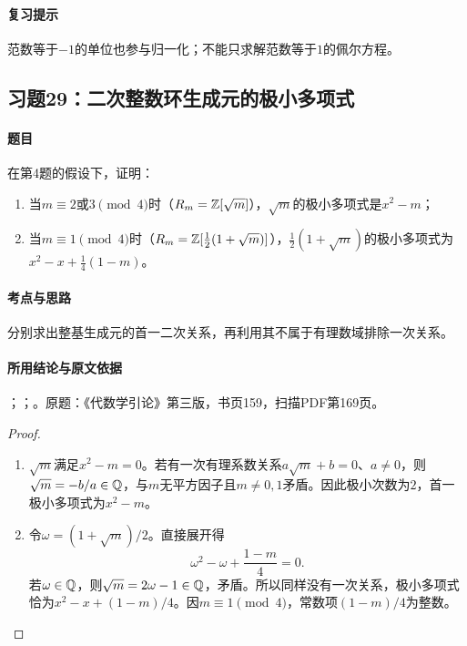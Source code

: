 \paragraph{复习提示}

范数等于$-1$的单位也参与归一化；不能只求解范数等于$1$的佩尔方程。

\subsection{习题29：二次整数环生成元的极小多项式}

\label{ex:4:29}

\paragraph{题目}

在第4题的假设下，证明：
\begin{enumerate}[label=(\roman*)]
\item 当$m\equiv2$或$3\pmod4$时（$R_m=\mathbb Z[\sqrt m]$），$\sqrt m$的极小多项式是$x^2-m$；
\item 当$m\equiv1\pmod4$时（$R_m=\mathbb Z[\tfrac12(1+\sqrt m)]$），$\tfrac12(1+\sqrt m)$的极小多项式为$x^2-x+\tfrac14(1-m)$。
\end{enumerate}

\paragraph{考点与思路}

分别求出整基生成元的首一二次关系，再利用其不属于有理数域排除一次关系。

\paragraph{所用结论与原文依据}

；；。原题：《代数学引论》第三版，书页159，扫描PDF第169页。


\begin{proof}

\begin{enumerate}[label=(\roman*)]
\item $\sqrt m$满足$x^2-m=0$。若有一次有理系数关系$a\sqrt m+b=0$、$a\ne0$，则$\sqrt m=-b/a\in\mathbb Q$，与$m$无平方因子且$m\ne0,1$矛盾。因此极小次数为$2$，首一极小多项式为$x^2-m$。
\item 令$\omega=(1+\sqrt m)/2$。直接展开得
\[
\omega^2-\omega+\frac{1-m}{4}=0.
\]
若$\omega\in\mathbb Q$，则$\sqrt m=2\omega-1\in\mathbb Q$，矛盾。所以同样没有一次关系，极小多项式恰为$x^2-x+(1-m)/4$。因$m\equiv1\pmod4$，常数项$(1-m)/4$为整数。
\end{enumerate}

\end{proof}

